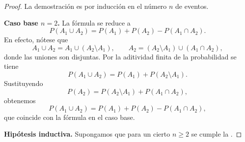 \documentclass[../Main.tex]{subfiles}
\begin{document}
\begin{proof}
La demostración es por inducción en el número \(n\) de eventos.


\noindent\textbf{Caso base \(n=2\).}  
La fórmula se reduce a
\[
   P(A_1\cup A_2)=P(A_1)+P(A_2)-P(A_1\cap A_2).
\]
En efecto, nótese que
\[
A_1\cup A_2 = A_1 \cup (A_2\setminus A_1), \qquad   
A_2 = (A_2\setminus A_1)\cup (A_1\cap A_2),
\]
donde las uniones son disjuntas.  
Por la aditividad finita de la probabilidad se tiene
\[
P(A_1\cup A_2) = P(A_1) + P(A_2\setminus A_1).
\]
Sustituyendo
\[
P(A_2) = P(A_2\setminus A_1) + P(A_1\cap A_2),
\]
obtenemos
\[
P(A_1\cup A_2) = P(A_1) + P(A_2) - P(A_1\cap A_2),
\]
que coincide con la fórmula en el caso base.

\noindent\textbf{Hipótesis inductiva.}
Supongamos que para un cierto \(n\ge 2\) se cumple la .



\end{proof}
\end{document}

